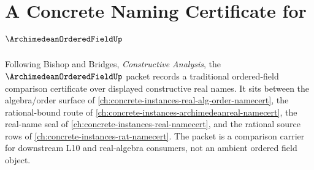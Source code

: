 \chapter{A Concrete Naming Certificate for $\ArchimedeanOrderedFieldUp$}
\label{ch:concrete-instances-archimedeanorderedfield-namecert}

Following Bishop and Bridges, \emph{Constructive Analysis}, the $\ArchimedeanOrderedFieldUp$ packet records a traditional ordered-field comparison certificate over displayed constructive real names. It sits between the algebra/order surface of \autoref{ch:concrete-instances-real-alg-order-namecert}, the rational-bound route of \autoref{ch:concrete-instances-archimedeanreal-namecert}, the real-name seal of \autoref{ch:concrete-instances-real-namecert}, and the rational source rows of \autoref{ch:concrete-instances-rat-namecert}. The packet is a comparison carrier for downstream L10 and real-algebra consumers, not an ambient ordered field object.

